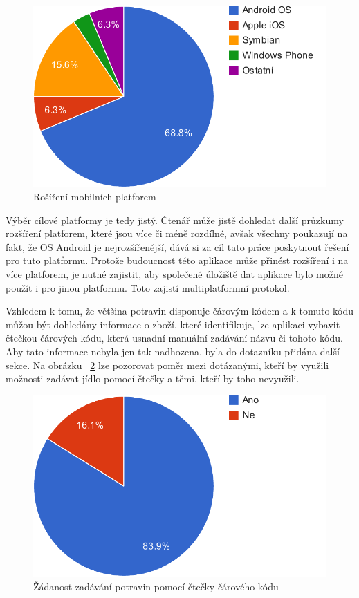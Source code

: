 \documentclass[thesis=B,czech]{FITthesis}[2013/10/20]
\begin{document}
\begin{figure}[H]
  \centering
  \includegraphics[scale=0.8]{charts/survey_os}
  \caption{Rošíření mobilních platforem}
  \label{fig:SurveyOS}
\end{figure}

Výběr cílové platformy je tedy jistý. Čtenář může jistě dohledat další průzkumy rozšíření platforem, které jsou více či méně rozdílné, avšak všechny poukazují na fakt, že OS Android je nejrozšířenější, dává si za cíl tato práce poskytnout řešení pro tuto platformu. Protože budoucnost této aplikace může přinést rozšíření i na více platforem, je nutné zajistit, aby společené úložiště dat aplikace bylo možné použít i pro jinou platformu. Toto zajistí multiplatformní protokol.

Vzhledem k tomu, že většina potravin disponuje čárovým kódem a k tomuto kódu můžou být dohledány informace o zboží, které identifikuje, lze aplikaci vybavit čtečkou čárových kódu, která usnadní manuální zadávání názvu či tohoto kódu. Aby tato informace nebyla jen tak nadhozena, byla do dotazníku přidána další sekce. Na obrázku ~\ref{fig:SurveyScan} lze pozorovat poměr mezi dotázanými, kteří by využili možnosti zadávat jídlo pomocí čtečky a těmi, kteří by toho nevyužili.

\begin{figure}[H]
  \centering
  \includegraphics[scale=0.8]{charts/survey_scan}
  \caption{Žádanost zadávání potravin pomocí čtečky čárového kódu}
  \label{fig:SurveyScan}
\end{figure}
\end{document}
